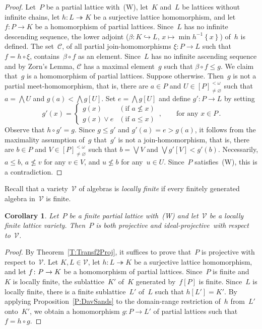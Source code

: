 \documentclass[reqno]{amsart}
\numberwithin{equation}{section}
\theoremstyle{plain}
\newtheorem{corollary}[theorem]{Corollary}
\theoremstyle{definition}
\theoremstyle{remark}
\numberwithin{figure}{section}
\numberwithin{table}{section}
\begin{document}
\begin{proof}
Let~$P$ be a partial lattice with~(W), let~$K$ and~$L$ be lattices without infinite chains, let $h\colon L\twoheadrightarrow K$ be a surjective lattice homomorphism, and let $f\colon P\to K$ be a homomorphism of partial lattices.
Since~$L$ has no infinite descending sequence, the lower adjoint ($\beta\colon K\hookrightarrow L$, $x\mapsto\min h^{-1}{\left\{{x}\right\}}$) of~$h$ is defined.
The set~${\mathcal{C}}$, of all partial {join-ho\-mo\-mor\-phism}{s} $\xi\colon P\to L$ such that $f=h\circ\xi$, contains~$\beta\circ f$ as an element.
Since~$L$ has no infinite ascending sequence and by Zorn's Lemma, ${\mathcal{C}}$ has a maximal element~$g$ such that $\beta\circ f\leq g$.
We claim that~$g$ is a homomorphism of partial lattices.
Suppose otherwise.
Then~$g$ is not a partial {meet-ho\-mo\-mor\-phism}, that is, there are $a\in P$ and $U\in{[{P}]_{\neq{\varnothing}}^{<\omega}}$ such that $a=\bigwedge U$ and $g(a)<\bigwedge g[U]$.
Set $e=\bigwedge g[U]$ and define $g'\colon P\to L$ by setting
 \[
 g'(x)=\begin{cases}
 g(x)&(\text{if }a\nleq x)\\
 g(x)\vee e&(\text{if }a\leq x)
 \end{cases}\,,\qquad\text{for any }x\in P\,.
 \]
Observe that $h\circ g'=g$.
Since $g\leq g'$ and $g'(a)=e>g(a)$, it follows from the maximality assumption of~$g$ that~$g'$ is not a {join-ho\-mo\-mor\-phism}, that is, there are $b\in P$ and $V\in{[{P}]_{\neq{\varnothing}}^{<\omega}}$ such that $b=\bigvee V$ and $\bigvee g'[V]<g'(b)$.
Necessarily, $a\leq b$, $a\nleq v$ for any $v\in V$, and $u\nleq b$ for any~$u\in U$.
Since~$P$ satisfies~(W), this is a contradiction.
\end{proof}

Recall that a variety~${\mathcal{V}}$ of algebras is \emph{locally finite} if every finitely generated algebra in~${\mathcal{V}}$ is finite.

\begin{corollary}\label{C:DavSands1}
Let~$P$ be a finite partial lattice with~\textup{(W)} and let~${\mathcal{V}}$ be a locally finite lattice variety.
Then~$P$ is both projective and {i\-de\-al-pro\-jec\-tive}\ with respect to~${\mathcal{V}}$.
\end{corollary}

\begin{proof}
By Theorem~\ref{T:Transf2Proj}, it suffices to prove that~$P$ is projective with respect to~${\mathcal{V}}$.
Let $K,L\in{\mathcal{V}}$, let $h\colon L\twoheadrightarrow K$ be a surjective lattice homomorphism, and let $f\colon P\to\nobreak K$ be a homomorphism of partial lattices.
Since~$P$ is finite and~$K$ is locally finite, the sublattice~$K'$ of~$K$ generated by~$f[P]$ is finite.
Since~$L$ is locally finite, there is a finite sublattice~$L'$ of~$L$ such that $h[L']=K'$.
By applying Proposition~\ref{P:DavSands} to the domain-range restriction of~$h$ from~$L'$ onto~$K'$, we obtain a homomorphism $g\colon P\to L'$ of partial lattices such that $f=h\circ g$.
\end{proof}
\end{document}
